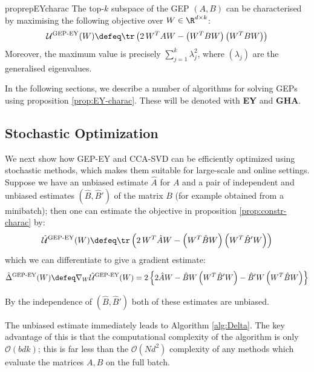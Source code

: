 \begin{restatable}{proprep}{EYcharac}
    \label{prop:EY-charac}
    The top-$k$ subspace of the GEP $(A,B)$ can be characterised by maximising the following objective over $W \in \R^{d \times k}$:
    \begin{align}
        \mathcal{U}^\text{GEP-EY}(W) \defeq \tr \left( 2\, W^T A W - \left(W^T B W\right) \left(W^T B W\right) \right)
    \end{align}
    Moreover, the maximum value is precisely $\sum_{j=1}^k \lambda_j^2$, where $(\lambda_j)$ are the generalised eigenvalues.
\end{restatable}


In the following sections, we describe a number of algorithms for solving GEPs using proposition \ref{prop:EY-charac}.
These will be denoted with \textbf{EY} and \textbf{GHA}.

\subsection{Stochastic Optimization}

We next show how GEP-EY and CCA-SVD can be efficiently optimized using stochastic methods, which makes them suitable for large-scale and online settings.
Suppose we have an unbiased estimate $\hat{A}$ for $A$ and a pair of independent and unbiased estimates $(\hat{B},\hat{B}')$ of the matrix $B$ (for example obtained from a minibatch); then one can estimate the objective in proposition \ref{prop:constr-charac} by:
\begin{align}
    \hat{\mathcal{U}}^\text{GEP-EY}(W) \defeq \tr \left( 2\, W^T \hat{A} W - \left(W^T \hat{B} W\right) \left(W^T \hat{B}' W\right) \right)
\end{align}
which we can differentiate to give a gradient estimate:
\begin{align}\label{eq:GEP-EY-grad}
    \hat{\Delta}^{\text{GEP-EY}}(W)
    \defeq \nabla_W \hat{\mathcal{U}}^\text{GEP-EY}(W)
    = 2 \left\{ 2 \hat{A} W - \hat{B} W \left(W^T \hat{B}' W \right) - \hat{B}' W \left(W^T \hat{B} W \right) \right\}
\end{align}

By the independence of $(\hat{B},\hat{B}')$ both of these estimates are unbiased.

The unbiased estimate immediately leads to Algorithm \ref{alg:Delta}.
The key advantage of this is that the computational complexity of the algorithm is only $\mathcal{O}(b d k)$; this is far less than the $\mathcal{O}(N d^2)$ complexity of any methods which evaluate the matrices $A,B$ on the full batch.

